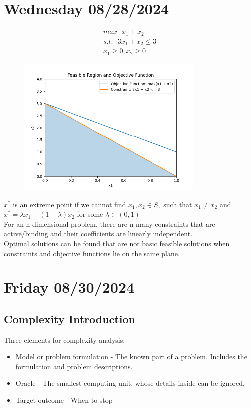 \section{Wednesday 08/28/2024}

\begin{gather}
  max \text{ } {x_1 + x_2} \\
  s.t. \text{ } 3x_1 + x_2 \leq 3 \\
  x_1 \geq 0, x_2 \geq 0
\end{gather}

\begin{figure}[htbp]
  \centerline{\includegraphics[width=0.8\textwidth]{images/08282024example.png}}
\end{figure}

$x^*$ is an extreme point if we cannot find $x_1, x_2 \in S, $ such that $x_1 \neq x_2 $ and
$x^* = \lambda x_1 + (1-\lambda)x_2$ for some $\lambda \in (0,1)$
\\
For an n-dimensional problem, there are n-many constraints that are active/binding and their coefficients are linearly independent. 
\\
Optimal solutions can be found that are not basic feasible solutions when constraints and objective functions lie on the same plane.
\\

\section{Friday 08/30/2024}
\subsection{Complexity Introduction}
Three elements for complexity analysis:
\begin{itemize}
  \item Model or problem formulation - The known part of a problem. Includes the formulation and problem descriptions.
  \item Oracle - The smallest computing unit, whose details inside can be ignored.
  \item Target outcome - When to stop
\end{itemize}


